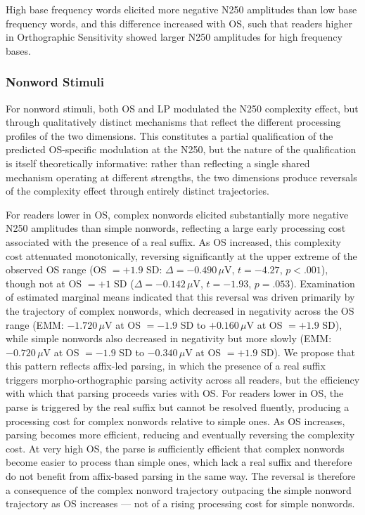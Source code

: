 \documentclass[utf8]{FrontiersinHarvard} %
\begin{document}
	High base frequency words elicited more negative N250 amplitudes than low base frequency words, and this difference increased with OS, such that readers higher in Orthographic Sensitivity showed larger N250 amplitudes for high frequency bases.
	
	\subsubsection{Nonword Stimuli}
	
	For nonword stimuli, both OS and LP modulated the N250 complexity effect, but through qualitatively distinct mechanisms that reflect the different processing profiles of the two dimensions. This constitutes a partial qualification of the predicted OS-specific modulation at the N250, but the nature of the qualification is itself theoretically informative: rather than reflecting a single shared mechanism operating at different strengths, the two dimensions produce reversals of the complexity effect through entirely distinct trajectories.
	
	For readers lower in OS, complex nonwords elicited substantially more negative N250 amplitudes than simple nonwords, reflecting a large early processing cost associated with the presence of a real suffix. As OS increased, this complexity cost attenuated monotonically, reversing significantly at the upper extreme of the observed OS range (OS $= +1.9$ SD: $\Delta = -0.490\,\mu$V, $t = -4.27$, $p < .001$), though not at OS $= +1$ SD ($\Delta = -0.142\,\mu$V, $t = -1.93$, $p = .053$). Examination of estimated marginal means indicated that this reversal was driven primarily by the trajectory of complex nonwords, which decreased in negativity across the OS range (EMM: $-1.720\,\mu$V at OS $= -1.9$ SD to $+0.160\,\mu$V at OS $= +1.9$ SD), while simple nonwords also decreased in negativity but more slowly (EMM: $-0.720\,\mu$V at OS $= -1.9$ SD to $-0.340\,\mu$V at OS $= +1.9$ SD). We propose that this pattern reflects affix-led parsing, in which the presence of a real suffix triggers morpho-orthographic parsing activity across all readers, but the efficiency with which that parsing proceeds varies with OS. For readers lower in OS, the parse is triggered by the real suffix but cannot be resolved fluently, producing a processing cost for complex nonwords relative to simple ones. As OS increases, parsing becomes more efficient, reducing and eventually reversing the complexity cost. At very high OS, the parse is sufficiently efficient that complex nonwords become easier to process than simple ones, which lack a real suffix and therefore do not benefit from affix-based parsing in the same way. The reversal is therefore a consequence of the complex nonword trajectory outpacing the simple nonword trajectory as OS increases --- not of a rising processing cost for simple nonwords.
	
\end{document}
